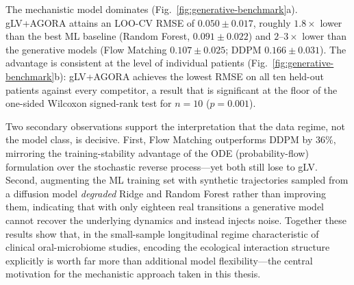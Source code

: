 The mechanistic model dominates (Fig.~\ref{fig:generative-benchmark}a). gLV+AGORA
attains an LOO-CV RMSE of $0.050\pm0.017$, roughly $1.8\times$ lower than the
best ML baseline (Random Forest, $0.091\pm0.022$) and $2$--$3\times$ lower than
the generative models (Flow Matching $0.107\pm0.025$; DDPM $0.166\pm0.031$). The
advantage is consistent at the level of individual patients
(Fig.~\ref{fig:generative-benchmark}b): gLV+AGORA achieves the lowest RMSE on all
ten held-out patients against every competitor, a result that is significant at
the floor of the one-sided Wilcoxon signed-rank test for $n=10$ ($p=0.001$).

Two secondary observations support the interpretation that the data regime, not
the model class, is decisive. First, Flow Matching outperforms DDPM by $36\%$,
mirroring the training-stability advantage of the ODE (probability-flow)
formulation over the stochastic reverse process---yet both still lose to gLV.
Second, augmenting the ML training set with synthetic trajectories sampled from a
diffusion model \emph{degraded} Ridge and Random Forest rather than improving
them, indicating that with only eighteen real transitions a generative model
cannot recover the underlying dynamics and instead injects noise. Together these
results show that, in the small-sample longitudinal regime characteristic of
clinical oral-microbiome studies, encoding the ecological interaction structure
explicitly is worth far more than additional model flexibility---the central
motivation for the mechanistic approach taken in this thesis.

